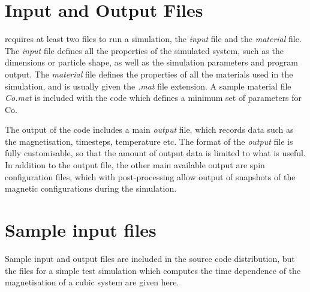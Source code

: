 \section*{Input and Output Files}
\vampire requires at least two files to run a simulation, the \textit{input} file and the \textit{material} file. The \textit{input} file defines all the properties of the simulated system, such as the dimensions or particle shape, as well as the simulation parameters and program output. The \textit{material} file defines the properties of all the materials used in the simulation, and is usually given the \textit{.mat} file extension. A sample material file \textit{Co.mat} is included with the code which defines a minimum set of parameters for Co. 

The output of the code includes a main \textit{output} file, which records data such as the magnetisation, timesteps, temperature etc. The format of the \textit{output} file is fully customisable, so that the amount of output data is limited to what is useful. In addition to the output file, the other main available output are spin configuration files, which with post-processing allow output of snapshots of the magnetic configurations during the simulation.

\section*{Sample input files}
Sample input and output files are included in the source code distribution, but the files for a simple test simulation which computes the time dependence of the magnetisation of a cubic system are given here.

